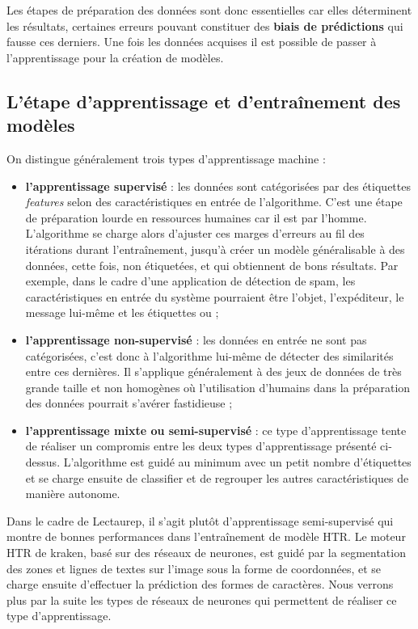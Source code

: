 Les étapes de préparation des données sont donc essentielles car elles déterminent les résultats, certaines erreurs pouvant constituer des \textbf{biais de prédictions} qui fausse ces derniers. Une fois les données acquises il est possible de passer à l'apprentissage pour la création de modèles. 

\subsection{L'étape d'apprentissage et d'entraînement des modèles}

On distingue généralement trois types d'apprentissage machine : 
\begin{itemize}
    \item \textbf{l'apprentissage supervisé} : les données sont catégorisées par des étiquettes \textit{features} selon des caractéristiques en entrée de l'algorithme. C'est une étape de préparation lourde en ressources humaines car il est  par l'homme. L'algorithme se charge alors d'ajuster ces marges d'erreurs au fil des itérations durant l'entraînement, jusqu'à créer un modèle généralisable à des données, cette fois, non étiquetées, et qui obtiennent de bons résultats. Par exemple, dans le cadre d'une application de détection de spam, les caractéristiques en entrée du système pourraient être l'objet, l'expéditeur, le message lui-même et les étiquettes  ou  ;\\
    \item \textbf{l'apprentissage non-supervisé} : les données en entrée ne sont pas catégorisées, c'est donc à l'algorithme lui-même de détecter des similarités entre ces dernières. Il s'applique généralement à des jeux de données de très grande taille et non homogènes où l'utilisation d'humains dans la préparation des données pourrait s'avérer fastidieuse ;\\
    \item \textbf{l'apprentissage mixte ou semi-supervisé} : ce type d'apprentissage tente de réaliser un compromis entre les deux types d'apprentissage présenté ci-dessus. L'algorithme est guidé au minimum avec un petit nombre d'étiquettes et se charge ensuite de classifier et de regrouper les autres caractéristiques de manière autonome.\\
\end{itemize}

Dans le cadre de Lectaurep, il s'agit plutôt d'apprentissage semi-supervisé qui montre de bonnes performances dans l'entraînement de modèle HTR. Le moteur HTR de kraken, basé sur des réseaux de neurones, est guidé par la segmentation des zones et lignes de textes sur l'image sous la forme de coordonnées, et se charge ensuite d'effectuer la prédiction des formes de caractères. Nous verrons plus par la suite les types de réseaux de neurones qui permettent de réaliser ce type d'apprentissage.

